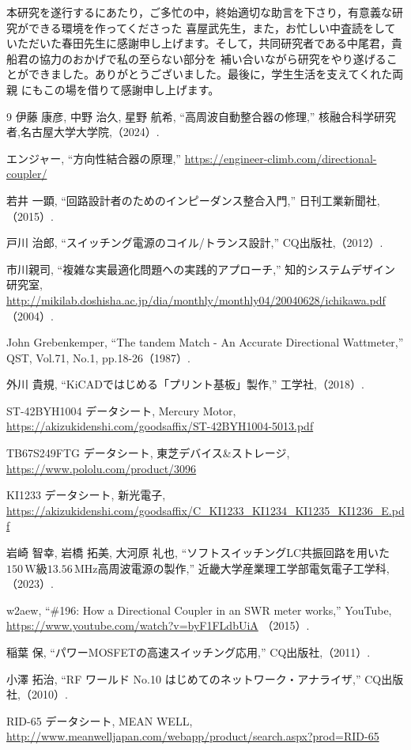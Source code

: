 \documentclass[uplatex, 12pt,oneside,openany]{ujbook}
\begin{document}
\acknowledgment
本研究を遂行するにあたり，ご多忙の中，終始適切な助言を下さり，有意義な研究ができる環境を作ってくださった
喜屋武先生，また，お忙しい中査読をしていただいた春田先生に感謝申し上げます。そして，共同研究者である中尾君，貴船君の協力のおかげで私の至らない部分を
補い合いながら研究をやり遂げることができました。ありがとうございました。最後に，学生生活を支えてくれた両親
にもこの場を借りて感謝申し上げます。
\begin{thebibliography}{9}
         伊藤 康彦, 中野 治久, 星野 航希,
       ``高周波自動整合器の修理,''
       核融合科学研究者,名古屋大学大学院,（2024）.

        エンジャー,
       ``方向性結合器の原理,''
       \url{https://engineer-climb.com/directional-coupler/}

        若井 一顕,
       ``回路設計者のためのインピーダンス整合入門,''
       日刊工業新聞社,（2015）.

       
        戸川 治郎,
       ``スイッチング電源のコイル/トランス設計,''
       CQ出版社,（2012）.

         市川親司,
       ``複雑な実最適化問題への実践的アプローチ,''
       知的システムデザイン研究室, \url{http://mikilab.doshisha.ac.jp/dia/monthly/monthly04/20040628/ichikawa.pdf} （2004）.


        John Grebenkemper,
       ``The tandem Match - An Accurate Directional Wattmeter,''
       QST, Vol.71, No.1, pp.18-26（1987）.

        外川 貴規,
       ``KiCADではじめる「プリント基板」製作,''
       工学社,（2018）.

       ST-42BYH1004 データシート, Mercury Motor, 
       \url{https://akizukidenshi.com/goodsaffix/ST-42BYH1004-5013.pdf}

        TB67S249FTG データシート, 東芝デバイス\&ストレージ, 
       \url{https://www.pololu.com/product/3096}

       KI1233 データシート, 新光電子, 
       \url{https://akizukidenshi.com/goodsaffix/C_KI1233_KI1234_KI1235_KI1236_E.pdf}

        岩崎 智幸, 岩橋 拓美, 大河原 礼也, 
       ``ソフトスイッチングLC共振回路を用いた$150\, \mathrm{W}$級$13.56\, \mathrm{MHz}$高周波電源の製作,''
       近畿大学産業理工学部電気電子工学科,（2023）.

       w2aew,
       ``\#196: How a Directional Coupler in an SWR meter works,''
       YouTube, \url{https://www.youtube.com/watch?v=byF1FLdbUiA} （2015）.

        稲葉 保,
       ``パワーMOSFETの高速スイッチング応用,''
       CQ出版社,（2011）.

        小澤 拓治,
       ``RF ワールド No.10 はじめてのネットワーク・アナライザ,''
       CQ出版社,（2010）.

        RID-65 データシート, MEAN WELL, 
       \url{http://www.meanwelljapan.com/webapp/product/search.aspx?prod=RID-65}
\end{thebibliography}
\end{document}

